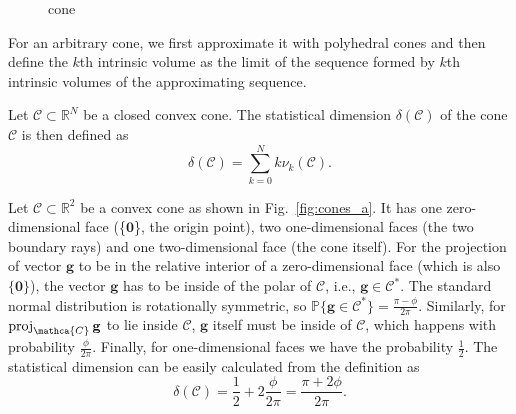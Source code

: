 \begin{figure}
\begin{subfigure}{0.48\linewidth}
        \caption{}
    \end{subfigure}
    \caption{cone}
    \label{fig:cones}
\end{figure}

For an arbitrary cone, we first approximate it with polyhedral cones and then define the $k$th intrinsic volume as the limit
of the sequence formed by $k$th intrinsic volumes of the approximating sequence.

\begin{definition}
    Let $\mathcal{C} \subset \mathbb{R}^N$ be a closed convex cone.
    The statistical dimension $\delta (\mathcal{C})$ of the cone $\mathcal{C}$ is then defined as
    \[\delta(\mathcal{C}) = \sum_{k=0}^N k \nu_k (\mathcal{C}).\]
\end{definition}

\begin{example}
    Let $\mathcal{C} \subset \mathbb{R}^2 $ be a convex cone as shown in Fig.~\ref{fig:cones_a}.
    It has one zero-dimensional face (\{$\mathbf{0}$\}, the origin point), two one-dimensional faces (the two boundary rays)
    and one two-dimensional face (the cone itself).
    For the projection of vector $\mathbf{g}$ to be in the relative interior of a zero-dimensional face (which is also $\{\mathbf{0}\}$),
    the vector $\mathbf{g}$ has to be inside of the polar of $\mathcal{C}$, i.e., $\mathbf{g} \in \mathcal{C}^*$.
    The standard normal distribution is rotationally symmetric, so $\mathbb{P}\{ \mathbf{g} \in \mathcal{C}^*\} = \frac{\pi - \phi}{2\pi} $.
    Similarly, for $\op{proj}_{\mathca{C}} \mathbf{g}$ to lie inside $\mathcal{C}$, $\mathbf{g}$ itself must be inside of $\mathcal{C}$,
    which happens with probability $\frac{\phi}{2\pi}$.
    Finally, for one-dimensional faces we have the probability $\frac{1}{2}$.
    The statistical dimension can be easily calculated from the definition as
    \[ \delta (\mathcal{C}) = \frac{1}{2} + 2\frac{\phi}{2\pi} = \frac{\pi + 2\phi}{2\pi}.\]
\end{example}

